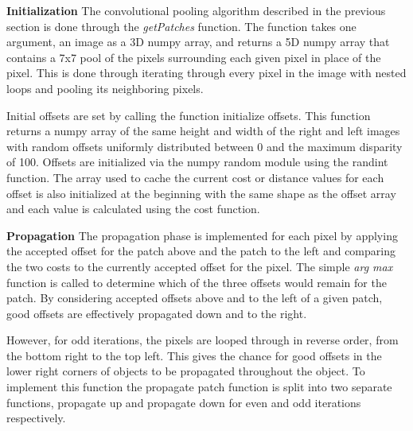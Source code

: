 \documentclass{article}
\begin{document}
\textbf{Initialization} The convolutional pooling algorithm described in the previous section is done through the \textit{getPatches} function. The function takes one argument, an image as a 3D numpy array, and returns a 5D numpy array that contains a 7x7 pool of the pixels surrounding each given pixel in place of the pixel. This is done through iterating through every pixel in the image with nested loops and pooling its neighboring pixels.

Initial offsets are set by calling the function initialize offsets. This function returns a numpy array of the same height and width of the right and left images with random offsets uniformly distributed between 0 and the maximum disparity of 100. Offsets are initialized via the numpy random module using the randint function. The array used to cache the current cost or distance values for each offset is also initialized at the beginning with the same shape as the offset array and each value is calculated using the cost function.

\textbf{Propagation} The propagation phase is implemented for each pixel by applying the accepted offset for the patch above and the patch to the left and comparing the two costs to the currently accepted offset for the pixel. The simple \textit{arg max} function is called to determine which of the three offsets would remain for the patch. By considering accepted offsets above and to the left of a given patch, good offsets are effectively propagated down and to the right.

However, for odd iterations, the pixels are looped through in reverse order, from the bottom right to the top left. This gives the chance for good offsets in the lower right corners of objects to be propagated throughout the object. To implement this function the propagate patch function is split into two separate functions, propagate up and propagate down for even and odd iterations respectively.
\end{document}
